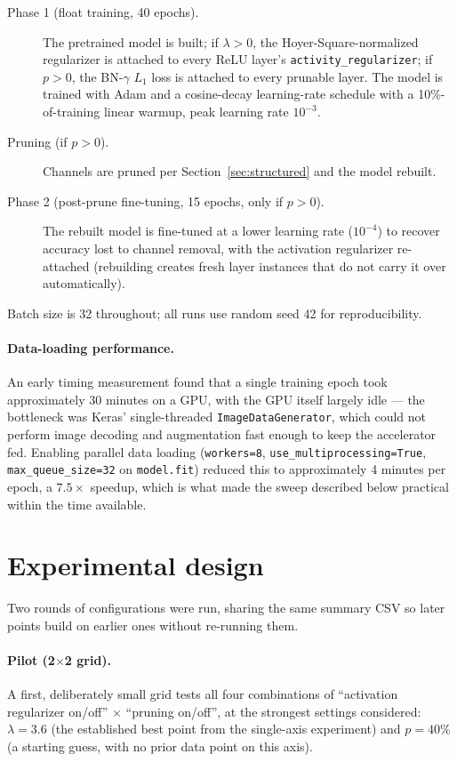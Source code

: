 \documentclass[11pt]{article}
\newcommand{\code}[1]{\texttt{#1}}
\begin{document}
\begin{description}
    \item[Phase 1 (float training, 40 epochs).] The pretrained model is built; if $\lambda>0$, the Hoyer-Square-normalized regularizer is attached to every ReLU layer's \code{activity\_regularizer}; if $p>0$, the BN-$\gamma$ $L_1$ loss is attached to every prunable layer. The model is trained with Adam and a cosine-decay learning-rate schedule with a 10\%-of-training linear warmup, peak learning rate $10^{-3}$.
    \item[Pruning (if $p>0$).] Channels are pruned per Section~\ref{sec:structured} and the model rebuilt.
    \item[Phase 2 (post-prune fine-tuning, 15 epochs, only if $p>0$).] The rebuilt model is fine-tuned at a lower learning rate ($10^{-4}$) to recover accuracy lost to channel removal, with the activation regularizer re-attached (rebuilding creates fresh layer instances that do not carry it over automatically).
\end{description}

Batch size is 32 throughout; all runs use random seed 42 for reproducibility.

\paragraph{Data-loading performance.} An early timing measurement found that a single training epoch took approximately 30 minutes on a GPU, with the GPU itself largely idle --- the bottleneck was Keras' single-threaded \code{ImageDataGenerator}, which could not perform image decoding and augmentation fast enough to keep the accelerator fed. Enabling parallel data loading (\code{workers=8}, \code{use\_multiprocessing=True}, \code{max\_queue\_size=32} on \code{model.fit}) reduced this to approximately 4 minutes per epoch, a $7.5\times$ speedup, which is what made the sweep described below practical within the time available.

\section{Experimental design}

Two rounds of configurations were run, sharing the same summary CSV so later points build on earlier ones without re-running them.

\paragraph{Pilot (2$\times$2 grid).} A first, deliberately small grid tests all four combinations of ``activation regularizer on/off'' $\times$ ``pruning on/off'', at the strongest settings considered: $\lambda=3.6$ (the established best point from the single-axis experiment) and $p=40\%$ (a starting guess, with no prior data point on this axis).
\end{document}
